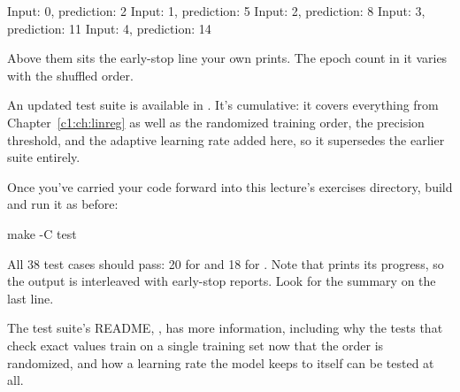 \begin{console}
Input: 0, prediction: 2
Input: 1, prediction: 5
Input: 2, prediction: 8
Input: 3, prediction: 11
Input: 4, prediction: 14
\end{console}

\noindent Above them sits the early-stop line your own  prints. The epoch count in it
varies with the shuffled order.

\label{c2:set:4}

\label{c2:ex:15}
An updated test suite is available in . It's cumulative: it
covers everything from Chapter~\ref{c1:ch:linreg} as well as the randomized training order, the
precision threshold, and the adaptive learning rate added here, so it supersedes the earlier suite
entirely.

Once you've carried your code forward into this lecture's exercises directory, build and run it as
before:

\begin{shell}
make -C test
\end{shell}

\noindent All 38 test cases should pass: 20 for  and 18 for . Note that
 prints its progress, so the output is interleaved with early-stop reports. Look for
the summary on the last line.

The test suite's README, , has more information,
including why the tests that check exact values train on a single training set now that the order
is randomized, and how a learning rate the model keeps to itself can be tested at all.
